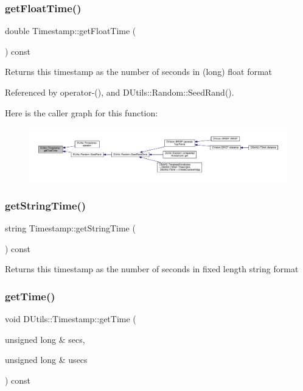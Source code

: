 \subsubsection{\texorpdfstring{get\+Float\+Time()}{getFloatTime()}}
{\footnotesize\ttfamily double Timestamp\+::get\+Float\+Time (\begin{DoxyParamCaption}{ }\end{DoxyParamCaption}) const}

Returns this timestamp as the number of seconds in (long) float format 

Referenced by operator-\/(), and D\+Utils\+::\+Random\+::\+Seed\+Rand().

Here is the caller graph for this function\+:\nopagebreak
\begin{figure}[H]
\begin{center}
\leavevmode
\includegraphics[width=350pt]{classDUtils_1_1Timestamp_a360ea9b3a339c315f1a1eb2416787088_icgraph}
\end{center}
\end{figure}
\mbox{\label{classDUtils_1_1Timestamp_af1db3a964b6a7b88e73f7bd3110efd79}} 
\subsubsection{\texorpdfstring{get\+String\+Time()}{getStringTime()}}
{\footnotesize\ttfamily string Timestamp\+::get\+String\+Time (\begin{DoxyParamCaption}{ }\end{DoxyParamCaption}) const}

Returns this timestamp as the number of seconds in fixed length string format \mbox{\label{classDUtils_1_1Timestamp_a15e5c1a751a3faef596437a69d4c3d88}} 
\subsubsection{\texorpdfstring{get\+Time()}{getTime()}}
{\footnotesize\ttfamily void D\+Utils\+::\+Timestamp\+::get\+Time (\begin{DoxyParamCaption}\item[{unsigned long \&}]{secs,  }\item[{unsigned long \&}]{usecs }\end{DoxyParamCaption}) const\hspace{0.3cm}{\ttfamily [inline]}}

